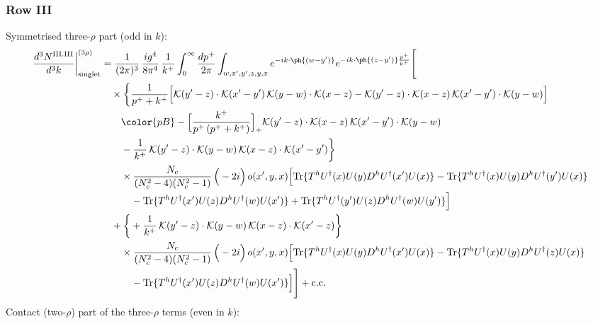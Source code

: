\subsubsection*{Row III}
Symmetrised three-$\rho$ part (odd in $k$):
\begin{align}
\frac{d^{3}N^{\rm III.III}}{d^{3}k}\bigg|^{(3\rho)}_{\rm singlet}&=\frac{1}{(2\pi)^{3}}\,\frac{ig^{4}}{8\pi^{4}}\,\frac{1}{k^{+}}\int_{0}^{\infty}\frac{dp^{+}}{2\pi}\int_{w,x',y',z,y,x}e^{-ik\cdot\ph{(w-y')}}e^{-ik\cdot\ph{(z-y')}\frac{p^{+}}{k^{+}}}\Bigg[\notag\\
&\quad\times\bigg\{\frac{1}{p^{+}+k^{+}}\Big[\mathcal{K}(y'-z)\cdot\mathcal{K}(x'-y')\,\mathcal{K}(y-w)\cdot\mathcal{K}(x-z)-\mathcal{K}(y'-z)\cdot\mathcal{K}(x-z)\,\mathcal{K}(x'-y')\cdot\mathcal{K}(y-w)\Big]\notag\\
&\qquad{\color{pB}-\Big[\frac{k^{+}}{p^{+}\,(p^{+}+k^{+})}\Big]_{+}\mathcal{K}(y'-z)\cdot\mathcal{K}(x-z)\,\mathcal{K}(x'-y')\cdot\mathcal{K}(y-w)}\notag\\
&\qquad-\frac{1}{k^{+}}\,\mathcal{K}(y'-z)\cdot\mathcal{K}(y-w)\,\mathcal{K}(x-z)\cdot\mathcal{K}(x'-y')\bigg\}\notag\\
&\qquad\times \frac{N_{c}}{(N_{c}^{2}-4)(N_{c}^{2}-1)}\,\Big(-2i\Big)\,o(x',y,x)\Big[{\rm Tr}\{T^{h}U^{\dagger}(x)U(y)D^{h}U^{\dagger}(x')U(x)\}-{\rm Tr}\{T^{h}U^{\dagger}(x)U(y)D^{h}U^{\dagger}(y')U(x)\}\notag\\
&\qquad\quad -{\rm Tr}\{T^{h}U^{\dagger}(x')U(z)D^{h}U^{\dagger}(w)U(x')\}+{\rm Tr}\{T^{h}U^{\dagger}(y')U(z)D^{h}U^{\dagger}(w)U(y')\}\Big]\notag\\
&\quad+\bigg\{+\frac{1}{k^{+}}\,\mathcal{K}(y'-z)\cdot\mathcal{K}(y-w)\,\mathcal{K}(x-z)\cdot\mathcal{K}(x'-z)\bigg\}\notag\\
&\qquad\times \frac{N_{c}}{(N_{c}^{2}-4)(N_{c}^{2}-1)}\,\Big(-2i\Big)\,o(x',y,x)\Big[{\rm Tr}\{T^{h}U^{\dagger}(x)U(y)D^{h}U^{\dagger}(x')U(x)\}-{\rm Tr}\{T^{h}U^{\dagger}(x)U(y)D^{h}U^{\dagger}(z)U(x)\}\notag\\
&\qquad\quad -{\rm Tr}\{T^{h}U^{\dagger}(x')U(z)D^{h}U^{\dagger}(w)U(x')\}\Big]\Bigg]+{\rm c.c.}\label{eq:E-III.III-3}
\end{align}
Contact (two-$\rho$) part of the three-$\rho$ terms (even in $k$):
